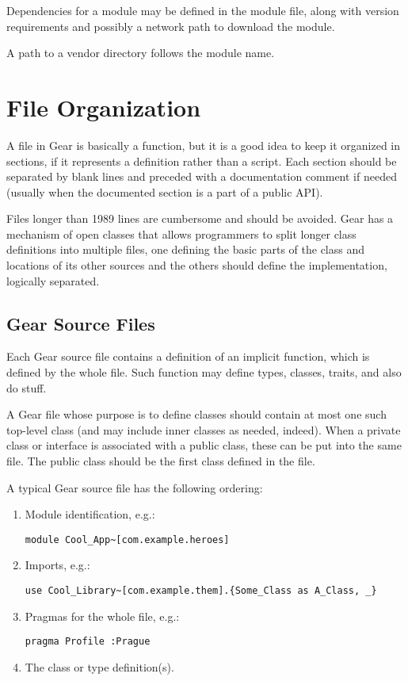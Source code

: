 Dependencies for a module may be defined in the module file, along with version requirements and possibly a network path to download the module. 

A path to a vendor directory follows the module name. 





\section{File Organization}

A file in Gear is basically a function, but it is a good idea to keep it organized in sections, if it represents a definition rather than a script. Each section should be separated by blank lines and preceded with a documentation comment if needed (usually when the documented section is a part of a public API). 

Files longer than 1989 lines are cumbersome and should be avoided. Gear has a mechanism of open classes that allows programmers to split longer class definitions into multiple files, one defining the basic parts of the class and locations of its other sources and the others should define the implementation, logically separated. 





\subsection{Gear Source Files}

Each Gear source file contains a definition of an implicit function, which is defined by the whole file. Such function may define types, classes, traits, and also do stuff. 

A Gear file whose purpose is to define classes should contain at most one such top-level class (and may include inner classes as needed, indeed). When a private class or interface is associated with a public class, these can be put into the same file. The public class should be the first class defined in the file. 

A typical Gear source file has the following ordering: 
\begin{enumerate}
\item Module identification, e.g.:
\begin{lstlisting}
module Cool_App~[com.example.heroes]
\end{lstlisting}

\item Imports, e.g.:
\begin{lstlisting}
use Cool_Library~[com.example.them].{Some_Class as A_Class, _}
\end{lstlisting}

\item Pragmas for the whole file, e.g.:
\begin{lstlisting}
pragma Profile :Prague
\end{lstlisting}

\item The class or type definition(s). 
\end{enumerate}






